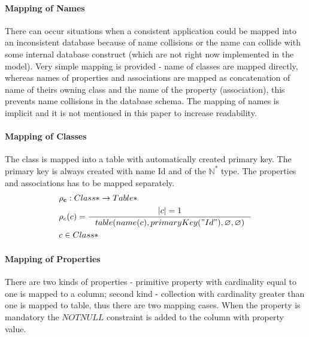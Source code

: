 \documentclass[11pt]{article}
\begin{document}
\paragraph{Mapping of Names} There can occur situations when a consistent application could be mapped into an inconsistent database because of name collisions or the name can collide with some internal database construct (which are not right now implemented in the model). Very simple mapping is provided - name of classes are mapped directly, whereas names of properties and associations are mapped as concatenation of name of theirs owning class and the name of the property (association), this prevents name collisions in the database schema. The mapping of names is implicit and it is not mentioned in this paper to increase readability.



\paragraph{Mapping of Classes} The class is mapped into a table with  automatically created primary key. The primary key is always created with name Id and of the $\mathbb{N^{*}}$ type. The properties and associations has to be mapped separately.
\begin{align*}
&	\mathbf{\rho_{c}} : Class*  \rightarrow Table* \\
&	\rho_{c}(c) = %
		\inference{|c| = 1}{table(name(c), primaryKey("Id"), \varnothing, \varnothing)} %
\\ 	
& c \in Class*
\end{align*}

\paragraph{Mapping of Properties}
There are two kinds of properties - primitive property with cardinality equal to one is mapped to a column; second kind - collection with cardinality greater than one is mapped to table, thus there are two mapping cases. When the property is mandatory the $NOTNULL$ constraint is added to the column with property value. 
\end{document}
